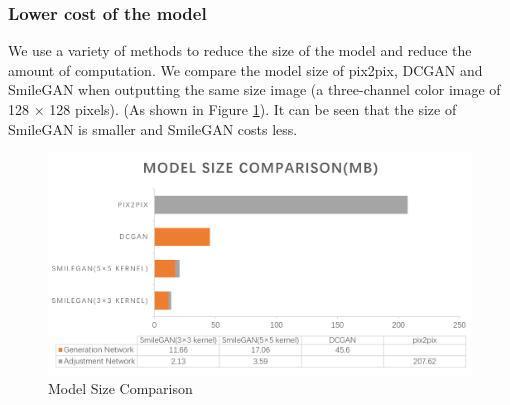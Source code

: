 \subsubsection*{Lower cost of the model}
We use a variety of methods to reduce the size of the model and reduce the amount of computation.
We compare the model size of pix2pix, DCGAN and SmileGAN when outputting the same size image (a three-channel color image of 128 × 128 pixels).
(As shown in Figure \ref{result_model_size}).
It can be seen that the size of SmileGAN is smaller and SmileGAN costs less.

\begin{figure}
    \begin{center}
    \includegraphics[width=\textwidth]{figures/result_model_size.png}
    \caption{Model Size Comparison}
    \label{result_model_size}
    \end{center}
\end{figure}